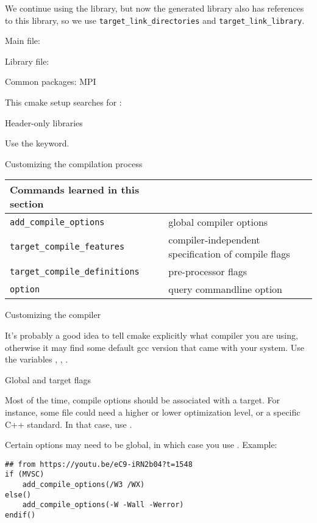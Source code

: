 We continue using the  library,
but now the generated library also has references to this library,
so we use \lstinline+target_link_directories+ and \lstinline+target_link_library+.

Main file:
%


Library file:
%


 {Common packages: MPI}

This cmake setup searches for :
%


 {Header-only libraries}

Use the  keyword.

 {Customizing the compilation process}

\begin{tabular}{lp{3in}}
  \toprule
  Commands learned in this section\\
  \midrule
  \lstinline+add_compile_options+&global compiler options\\
  \lstinline+target_compile_features+&compiler-independent specification of compile flags\\
  \lstinline+target_compile_definitions+&pre-processor flags\\
  \lstinline+option+&query commandline option\\
  \bottomrule
\end{tabular}

 {Customizing the compiler}

It's probably a good idea to tell cmake explicitly what compiler you are using,
otherwise it may find some default gcc version that came with your system.
Use the variables , ,
.

 {Global and target flags}

Most of the time, compile options should be associated with a target.
For instance, some file could need a higher or lower optimization level,
or a specific C++ standard.
In that case, use .

Certain options may need to be global, in which case you use
. Example:
\begin{lstlisting}
## from https://youtu.be/eC9-iRN2b04?t=1548
if (MVSC)
    add_compile_options(/W3 /WX)
else()
    add_compile_options(-W -Wall -Werror)
endif()
\end{lstlisting}

